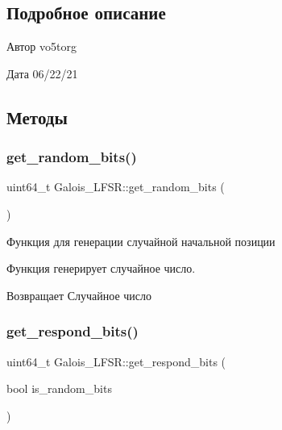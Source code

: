 \subsection{Подробное описание}
\begin{DoxyAuthor}{Автор}
vo5torg 
\end{DoxyAuthor}
\begin{DoxyDate}{Дата}
06/22/21 
\end{DoxyDate}


\subsection{Методы}
\mbox{\label{classGalois__LFSR_abc5cfd0aa22803188a1f81a5959f22eb}} 
\subsubsection{\texorpdfstring{get\+\_\+random\+\_\+bits()}{get\_random\_bits()}}
{\footnotesize\ttfamily uint64\+\_\+t Galois\+\_\+\+L\+F\+S\+R\+::get\+\_\+random\+\_\+bits (\begin{DoxyParamCaption}{ }\end{DoxyParamCaption})}



Функция для генерации случайной начальной позиции 

Функция генерирует случайное число.

\begin{DoxyReturn}{Возвращает}
Случайное число 
\end{DoxyReturn}
\mbox{\label{classGalois__LFSR_a1ceda4d66d840ff703cd14a3919b2f8b}} 
\subsubsection{\texorpdfstring{get\+\_\+respond\+\_\+bits()}{get\_respond\_bits()}}
{\footnotesize\ttfamily uint64\+\_\+t Galois\+\_\+\+L\+F\+S\+R\+::get\+\_\+respond\+\_\+bits (\begin{DoxyParamCaption}\item[{bool}]{is\+\_\+random\+\_\+bits }\end{DoxyParamCaption})}



